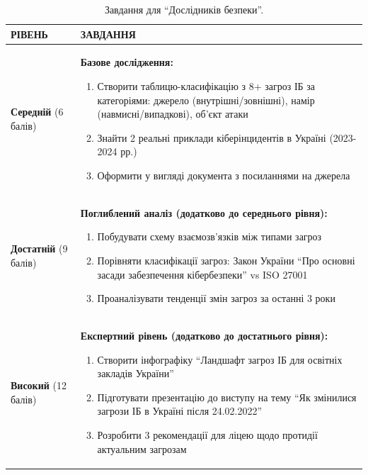 \begin{table}[h!]
\caption{Завдання для ``Дослідників безпеки''.}
\label{tab:lab1_acad_task0} %
\noindent %


\begin{tabular}{
  | >{\raggedright\arraybackslash}p{} 
  | >{\raggedright\arraybackslash}p{} |
}
\hline

\rowcolor{TableHeaderBlue}
\hfil \color{white}\textbf{РІВЕНЬ} & 
\hfil \color{white}\textbf{ЗАВДАННЯ} \\ \hline

\textbf{Середній} (6 балів)&
\textbf{Базове дослідження:}
\begin{enumerate}
    \item Створити таблицю-класифікацію з 8+ загроз ІБ за категоріями: джерело (внутрішні/зовнішні), намір (навмисні/випадкові), об’єкт атаки
    \item Знайти 2 реальні приклади кіберінцидентів в Україні (2023-2024 рр.)
    \item Оформити у вигляді документа з посиланнями на джерела
\end{enumerate} \\ \hline

\textbf{Достатній} (9 балів)&
\textbf{Поглиблений аналіз (додатково до середнього рівня):}
\begin{enumerate}
    \item Побудувати схему взаємозв’язків між типами загроз
    \item Порівняти класифікації загроз: Закон України ``Про основні засади забезпечення кібербезпеки'' vs ISO 27001
    \item Проаналізувати тенденції змін загроз за останні 3 роки
\end{enumerate} \\ \hline

\textbf{Високий} (12 балів)&
\textbf{Експертний рівень (додатково до достатнього рівня):}
\begin{enumerate}
    \item Створити інфографіку ``Ландшафт загроз ІБ для освітніх закладів України''
    \item Підготувати презентацію до виступу на тему ``Як змінилися загрози ІБ в Україні після 24.02.2022''
    \item Розробити 3 рекомендації для ліцею щодо протидії актуальним загрозам
\end{enumerate} \\ \hline
\end{tabular}
\end{table}



